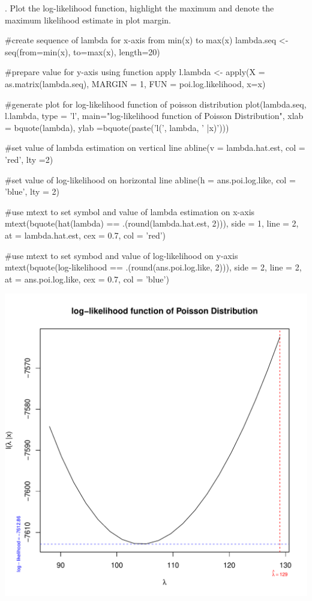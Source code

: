 \documentclass[12pt, oneside]{report}\usepackage[]{graphicx}\usepackage[]{color}
\makeatletter
\def\maxwidth{ %
  \ifdim\Gin@nat@width>\linewidth
    \linewidth
  \else
    \Gin@nat@width
  \fi
}
\makeatother
\begin{document}
. Plot the log-likelihood function, highlight the maximum and denote the maximum likelihood
estimate in plot margin.
\begin{Schunk}
\begin{Sinput}
#create sequence of lambda for x-axis from min(x) to max(x)
lambda.seq <- seq(from=min(x), to=max(x), length=20)

#prepare value for y-axis using function apply
l.lambda <- apply(X = as.matrix(lambda.seq), MARGIN = 1, FUN = poi.log.likelihood, x=x)

#generate plot for log-likelihood function of poisson distribution
plot(lambda.seq, l.lambda, type = 'l', main="log-likelihood function of Poisson Distribution", xlab = bquote(lambda), ylab =bquote(paste('l(', lambda, ' |x)')))

#set value of lambda estimation on vertical line 
abline(v = lambda.hat.est, col = 'red', lty =2)

#set value of log-likelihood on horizontal line
abline(h = ans.poi.log.like, col = 'blue', lty = 2)

#use mtext to set symbol and value of lambda estimation on x-axis
mtext(bquote(hat(lambda) == .(round(lambda.hat.est, 2))), side = 1, line = 2,
      at = lambda.hat.est, cex = 0.7, col = 'red')

#use mtext to set symbod and value of log-likelihood on y-axis
mtext(bquote(log-likelihood == .(round(ans.poi.log.like, 2))), side = 2, line = 2,
      at = ans.poi.log.like, cex = 0.7, col = 'blue')
\end{Sinput}

\includegraphics[width=\maxwidth]{figure/unnamed-chunk-3-1} \end{Schunk}
\end{document}
